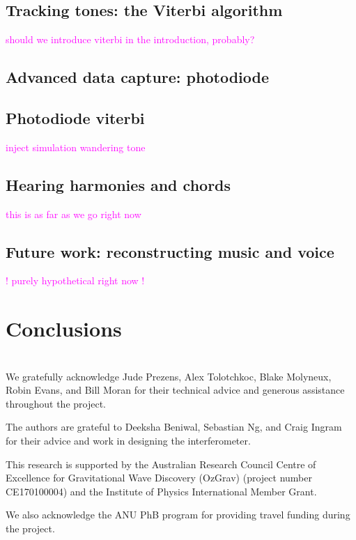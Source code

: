 \documentclass[prb,preprint]{revtex4-1}
\newcommand{\jam}{\textcolor{magenta}}
\begin{document}

\subsection{Tracking tones: the Viterbi algorithm}
\jam{should we introduce viterbi in the introduction, probably?}

\subsection{Advanced data capture: photodiode}

\subsection{Photodiode viterbi}
\jam{inject simulation wandering tone}


\subsection{Hearing harmonies and chords}
\jam{this is as far as we go right now}

\subsection{Future work: reconstructing music and voice}
\jam{! purely hypothetical right now !}


\section{Conclusions}


\appendix
\section{}


\begin{acknowledgments}
We gratefully acknowledge Jude Prezens, Alex Tolotchkoc, Blake Molyneux, Robin Evans, and Bill Moran for their technical advice and generous assistance throughout the project.

The authors are grateful to Deeksha Beniwal, Sebastian Ng, and Craig Ingram for their advice and work in designing the interferometer. 

This research is supported by the Australian Research Council Centre of Excellence for Gravitational Wave Discovery (OzGrav) (project number CE170100004) and the Institute of Physics International Member Grant.

We also acknowledge the ANU PhB program for providing travel funding during the project.


\end{acknowledgments}




\end{document}
